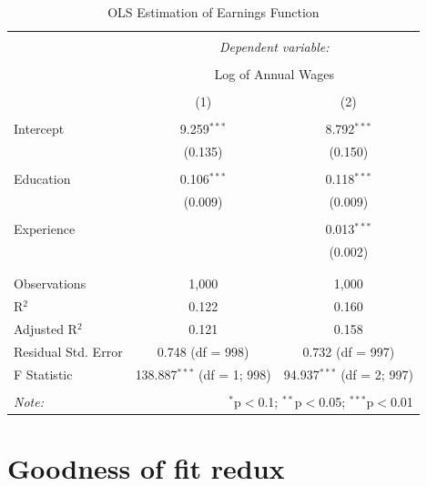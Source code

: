\documentclass[
]{book}
\theoremstyle{definition}
\theoremstyle{definition}
\theoremstyle{definition}
\theoremstyle{definition}
\theoremstyle{remark}
\begin{document}
\begin{table}[!htbp] \centering 
  \caption{OLS Estimation of Earnings Function} 
  \label{} 
\begin{tabular}{@{\extracolsep{5pt}}lcc} 
\\[-1.8ex]\hline 
\hline \\[-1.8ex] 
 & \multicolumn{2}{c}{\textit{Dependent variable:}} \\ 
\cline{2-3} 
\\[-1.8ex] & \multicolumn{2}{c}{Log of Annual Wages} \\ 
\\[-1.8ex] & (1) & (2)\\ 
\hline \\[-1.8ex] 
 Intercept & 9.259$^{***}$ & 8.792$^{***}$ \\ 
  & (0.135) & (0.150) \\ 
  & & \\ 
 Education & 0.106$^{***}$ & 0.118$^{***}$ \\ 
  & (0.009) & (0.009) \\ 
  & & \\ 
 Experience &  & 0.013$^{***}$ \\ 
  &  & (0.002) \\ 
  & & \\ 
\hline \\[-1.8ex] 
Observations & 1,000 & 1,000 \\ 
R$^{2}$ & 0.122 & 0.160 \\ 
Adjusted R$^{2}$ & 0.121 & 0.158 \\ 
Residual Std. Error & 0.748 (df = 998) & 0.732 (df = 997) \\ 
F Statistic & 138.887$^{***}$ (df = 1; 998) & 94.937$^{***}$ (df = 2; 997) \\ 
\hline 
\hline \\[-1.8ex] 
\textit{Note:}  & \multicolumn{2}{r}{$^{*}$p$<$0.1; $^{**}$p$<$0.05; $^{***}$p$<$0.01} \\ 
\end{tabular} 
\end{table}

\hypertarget{goodness-of-fit-redux}{%
\section{Goodness of fit redux}\label{goodness-of-fit-redux}}
\end{document}
